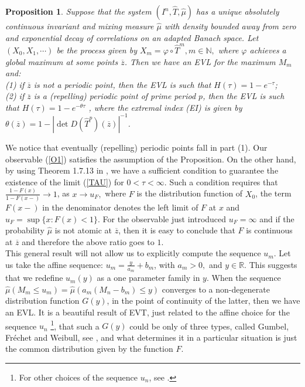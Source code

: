 \documentclass[12pt,reqno,a4paper]{amsart}
\newtheorem{prop}[thm]{Proposition}
\let\phi\varphi
\begin{document}
\begin{prop}\label{P1}
Suppose that the system $(I^n, \hat{T}, \hat{\mu})$ has a unique absolutely continuous invariant and  mixing measure   $\hat{\mu}$ with density
bounded away from zero and exponential decay of correlations on an adapted Banach space.  Let $(X_0, X_1, \cdots)$ be the process given by $X_m = \phi\circ \hat{T}^m, m\in \mathbb{N},$
  where $\phi$  achieves a
global maximum at some points $\overline{z}$. Then we have an EVL for the maximum $M_m$ and:\\
(1) if $\overline{z}$ is not a periodic point, then the EVL is such that $H(\tau)=1-e^{-\tau}$;\\
(2) if $\overline{z}$ is a (repelling) periodic point of prime period $p$, then the EVL is
such that $H(\tau)=1-e^{-\theta\tau}$ , where the {\em extremal index (EI)}  is given by $\theta(\overline{z}) = 1-| \det D(\hat{T}^{p})(\overline{z})|^{-1}$.
\end{prop}
We notice that eventually (repelling) periodic points fall in part (1). Our observable (\ref{O1}) satisfies the assumption of the Proposition. On the other hand, by using Theorem 1.7.13 in \cite{MRGH}, we
have a sufficient condition to guarantee the existence of the limit (\ref{TAU})  for $0<\tau<\infty.$ Such a condition requires that $\frac{1-F(x)}{1-F(x-)}\rightarrow 1$, as $x\rightarrow u_F,$ where $F$ is
 the distribution function of $X_0$, the term $F(x-)$ in the denominator denotes
the left limit of $F$ at $x$ and $u_F=\sup\{x: F(x) < 1\}$. For the
observable just introduced $u_F = \infty$ and if the probability  $\hat{\mu}$ is not atomic at $\overline{z}$, then it is easy to conclude that $F$ is continuous at $\overline{z}$ and therefore the above ratio goes to $1$.\\

This general result will not allow us to explicitly compute the sequence $u_m.$ Let us take the  affine sequence: $u_m=\frac{y}{a_m}+b_m$, with $a_m>0,$ and $y\in \mathbb{R}$. This suggests that we redefine $u_m(y)$ as a one parameter family in $y.$  When the sequence  $\hat{\mu}(M_m\le u_m)=\hat{\mu}(a_m(M_n-b_m)\le y)$ converges to  a non-degenerate distribution function $G(y)$, in the point of continuity of the latter, then we have an EVL.
 It is a beautiful result of EVT, just related to the affine choice for the sequence $u_n$ \footnote{For other choices of the sequence $u_n$, see \cite{MRGH}.},  that such a $G(y)$ could be only of three types, called Gumbel, Fr\'echet and Weibull, see \cite{MRGH}, and what determines it in a particular situation is just the common distribution given by the  function $F.$\\
\end{document}
